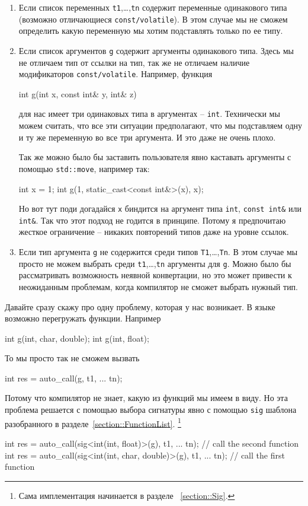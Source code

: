 \begin{enumerate}
\item Если список переменных \verb"t1",\ldots,\verb"tn" содержит переменные одинакового типа (возможно отличающиеся \verb"const/volatile").
В этом случае мы не сможем определить какую переменную мы хотим подставлять только по ее типу.

\item Если список аргументов \verb"g" содержит аргументы одинакового типа.
Здесь мы не отличаем тип от ссылки на тип, так же не отличаем наличие модификаторов \verb"const/volatile".
Например, функция
\begin{cppcode}[\nonumbers]
int g(int x, const int& y, int& z)
\end{cppcode}
для нас имеет три одинаковых типа в аргументах -- \verb"int".
Технически мы можем считать, что все эти ситуации предполагают, что мы подставляем одну и ту же переменную во все три аргумента.
И это даже не очень плохо.

Так же можно было бы заставить пользователя явно каставать аргументы с помощью \verb"std::move", например так:
\begin{cppcode}[\nonumbers]
int x = 1;
int g(1, static_cast<const int&>(x), x);
\end{cppcode}
Но вот тут поди догадайся \verb"x" биндится на аргумент типа \verb"int", \verb"const int&" или \verb"int&".
Так что этот подход не годится в принципе.
Потому я предпочитаю жесткое ограничение -- никаких повторений типов даже на уровне ссылок.

\item Если тип аргумента \verb"g" не содержится среди типов \verb"T1",\ldots,\verb"Tn".
В этом случае мы просто не можем выбрать среди \verb"t1",\ldots,\verb"tn" аргументы для \verb"g".
Можно было бы рассматривать возможность неявной конвертации, но это может привести к неожиданным проблемам, когда компилятор не сможет выбрать нужный тип.
\end{enumerate}

Давайте сразу скажу про одну проблему, которая у нас возникает.
В языке возможно перегружать функции.
Например
\begin{cppcode}[\nonumbers]
int g(int, char, double);
int g(int, float);
\end{cppcode}
То мы просто так не сможем вызвать
\begin{cppcode}[\nonumbers]
int res = auto_call(g, t1, ... tn);
\end{cppcode}
Потому что компилятор не знает, какую из функций мы имеем в виду.
Но эта проблема решается с помощью выбора сигнатуры явно с помощью \verb"sig" шаблона разобранного в разделе~\ref{section::FunctionList}.%
\footnote{Сама имплементация начинается в разделе ~\ref{section::Sig}.}
\begin{cppcode}[\nonumbers]
int res = auto_call(sig<int(int, float)>(g), t1, ... tn);        // call the second function
int res = auto_call(sig<int(int, char, double)>(g), t1, ... tn); // call the first function
\end{cppcode}

